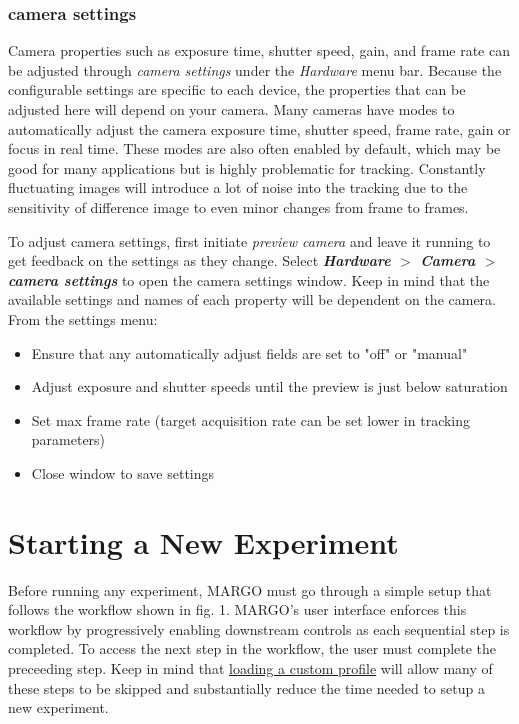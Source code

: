 \documentclass[11pt]{article}
\begin{document}
\hypertarget{camsettings}{\subsubsection{camera settings}}

Camera properties such as exposure time, shutter speed, gain, and frame rate can be adjusted through \textit{camera settings} under the \textit{Hardware} menu bar. Because the configurable settings are specific to each device, the properties that can be adjusted here will depend on your camera. Many cameras have modes to automatically adjust the camera exposure time, shutter speed, frame rate, gain or focus in real time. These modes are also often enabled by default, which may be good for many applications but is highly problematic for tracking. Constantly fluctuating images will introduce a lot of noise into the tracking due to the sensitivity of difference image to even minor changes from frame to frames.

To adjust camera settings, first initiate \textit{preview camera} and leave it running to get feedback on the settings as they change. Select \textbf{\textit{Hardware} $>$ \textit{Camera} $>$ \textit{camera settings}} to open the camera settings window. Keep in mind that the available settings and names of each property will be dependent on the camera. From the settings menu:

\begin{itemize}
	\itemsep0em 
	\item Ensure that any automatically adjust fields are set to "off" or "manual"
	\item Adjust exposure and shutter speeds until the preview is just below saturation
	\item Set max frame rate (target acquisition rate can be set lower in tracking parameters)
	\item Close window to save settings
\end{itemize} 

\section{Starting a New Experiment}

Before running any experiment, MARGO must go through a simple setup that follows the workflow shown in fig. 1. MARGO's user interface enforces this workflow by progressively enabling downstream controls as each sequential step is completed. To access the next step in the workflow, the user must complete the preceeding step. Keep in mind that \hyperlink{saveprofile}{loading a custom profile} will allow many of these steps to be skipped and substantially reduce the time needed to setup a new experiment.
\end{document}

